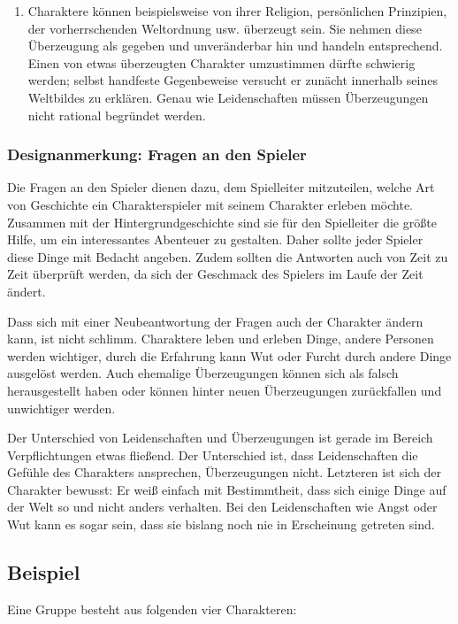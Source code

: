 \begin{enumerate}
  \item Charaktere können beispielsweise von ihrer Religion, persönlichen Prinzipien, der vorherrschenden Weltordnung usw. überzeugt sein. Sie nehmen diese Überzeugung als gegeben und unveränderbar hin und handeln entsprechend. Einen von etwas überzeugten Charakter umzustimmen dürfte schwierig werden; selbst handfeste Gegenbeweise versucht er zunächt innerhalb seines Weltbildes zu erklären. Genau wie Leidenschaften müssen Überzeugungen nicht rational begründet werden.
\end{enumerate}

\begin{design}
\subsubsection{Designanmerkung: Fragen an den Spieler}
Die Fragen an den Spieler dienen dazu, dem Spielleiter mitzuteilen, welche Art von Geschichte ein Charakterspieler mit seinem Charakter erleben möchte. Zusammen mit der Hintergrundgeschichte sind sie für den Spielleiter die größte Hilfe, um ein interessantes Abenteuer zu gestalten. Daher sollte jeder Spieler diese Dinge mit Bedacht angeben. Zudem sollten die Antworten auch von Zeit zu Zeit überprüft werden, da sich der Geschmack des Spielers im Laufe der Zeit ändert.

Dass sich mit einer Neubeantwortung der Fragen auch der Charakter ändern kann, ist nicht schlimm. Charaktere leben und erleben Dinge, andere Personen werden wichtiger, durch die Erfahrung kann Wut oder Furcht durch andere Dinge ausgelöst werden. Auch ehemalige Überzeugungen können sich als falsch herausgestellt haben oder können hinter neuen Überzeugungen zurückfallen und unwichtiger werden.
\end{design}

Der Unterschied von Leidenschaften und Überzeugungen ist gerade im Bereich Verpflichtungen etwas fließend. Der Unterschied ist, dass Leidenschaften die Gefühle des Charakters ansprechen, Überzeugungen nicht. Letzteren ist sich der Charakter bewusst: Er weiß einfach mit Bestimmtheit, dass sich einige Dinge auf der Welt so und nicht anders verhalten. Bei den Leidenschaften wie Angst oder Wut kann es sogar sein, dass sie bislang noch nie in Erscheinung getreten sind.

\subsection{Beispiel}\label{BeispielCharaktere}
Eine Gruppe besteht aus folgenden vier Charakteren:

